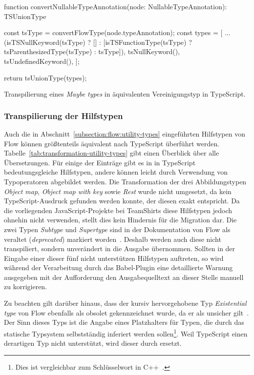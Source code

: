 \bigbreak
\begin{listing}[htb]
\begin{textcode}
function convertNullableTypeAnnotation(node: NullableTypeAnnotation): TSUnionType {
  const tsType = convertFlowType(node.typeAnnotation);
  const types = [
    ...(isTSNullKeyword(tsType)
      ? []
      : [isTSFunctionType(tsType) ? tsParenthesizedType(tsType) : tsType]),
    tsNullKeyword(),
    tsUndefinedKeyword(),
  ];

  return tsUnionType(types);
}
\end{textcode}
\listingvspace
\caption{Transpilierung eines \textit{Maybe types} in äquivalenten Vereinigungstyp in TypeScript.}
\label{code:convert-nullable-type}
\end{listing}

\subsubsection{Transpilierung der Hilfstypen}

Auch die in Abschnitt~\ref{subsection:flow:utility-types} eingeführten Hilfstypen von Flow können größtenteils äquivalent nach TypeScript überführt werden. Tabelle~\ref{tab:transformation-utility-types} gibt einen Überblick über alle Übersetzungen. Für einige der Einträge gibt es in in TypeScript bedeutungsgleiche Hilfstypen, andere können leicht durch Verwendung von Typoperatoren abgebildet werden.
Die Transformation der drei Abbildungstypen \textit{Object map}, \textit{Object map with key} sowie \textit{Rest} wurde nicht umgesetzt, da kein TypeScript-Ausdruck gefunden werden konnte, der diesen exakt entspricht. Da die vorliegenden JavaScript-Projekte bei TeamShirts diese Hilfstypen jedoch ohnehin nicht verwenden, stellt dies kein Hindernis für die Migration dar. Die zwei Typen \textit{Subtype} und \textit{Supertype} sind in der Dokumentation von Flow als veraltet (\textit{deprecated}) markiert worden~\autocite{FLOW:UTILITY_TYPES}. Deshalb werden auch diese nicht transpiliert, sondern unverändert in die Ausgabe übernommen. Sollten in der Eingabe einer dieser fünf nicht unterstützen Hilfstypen auftreten, so wird während der Verarbeitung durch das Babel-Plugin eine detaillierte Warnung ausgegeben mit der Aufforderung den Ausgabequelltext an dieser Stelle manuell zu korrigieren.

Zu beachten gilt darüber hinaus, dass der kursiv hervorgehobene Typ \textit{Existential type} von Flow ebenfalls als obsolet gekennzeichnet wurde, da er als unsicher gilt~\autocite{FLOW:LINT_RULE_REFERENCE}. Der Sinn dieses Typs ist die Angabe eines Platzhalters für Typen, die durch das statische Typsystem selbstständig inferiert werden sollen\footnote{Dies ist vergleichbar zum Schlüsselwort  in C++~\autocite[151]{CPP11_SPEC}.}. Weil TypeScript einen derartigen Typ nicht unterstützt, wird dieser durch  ersetzt.

